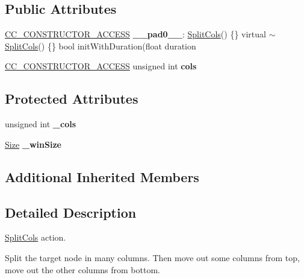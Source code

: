 \subsection*{Public Attributes}
\begin{DoxyCompactItemize}
\item 
\mbox{\label{classSplitCols_a5ceb248d193845de3dcc8bbf7230cadd}} 
\hyperlink{_2cocos2d_2cocos_2base_2ccConfig_8h_a25ef1314f97c35a2ed3d029b0ead6da0}{C\+C\+\_\+\+C\+O\+N\+S\+T\+R\+U\+C\+T\+O\+R\+\_\+\+A\+C\+C\+E\+SS} {\bfseries \+\_\+\+\_\+pad0\+\_\+\+\_\+}\+: \hyperlink{classSplitCols}{Split\+Cols}() \{\} virtual $\sim$\hyperlink{classSplitCols}{Split\+Cols}() \{\} bool init\+With\+Duration(float duration
\item 
\mbox{\label{classSplitCols_ae3af312ea5911766bec2323288a31c55}} 
\hyperlink{_2cocos2d_2cocos_2base_2ccConfig_8h_a25ef1314f97c35a2ed3d029b0ead6da0}{C\+C\+\_\+\+C\+O\+N\+S\+T\+R\+U\+C\+T\+O\+R\+\_\+\+A\+C\+C\+E\+SS} unsigned int {\bfseries cols}
\end{DoxyCompactItemize}
\subsection*{Protected Attributes}
\begin{DoxyCompactItemize}
\item 
\mbox{\label{classSplitCols_a43c0e9538721cdba5f49bebf1edefa50}} 
unsigned int {\bfseries \+\_\+cols}
\item 
\mbox{\label{classSplitCols_a49960809b26f44ae449d5eab8ffecab0}} 
\hyperlink{classSize}{Size} {\bfseries \+\_\+win\+Size}
\end{DoxyCompactItemize}
\subsection*{Additional Inherited Members}


\subsection{Detailed Description}
\hyperlink{classSplitCols}{Split\+Cols} action. 

Split the target node in many columns. Then move out some columns from top, move out the other columns from bottom. 

